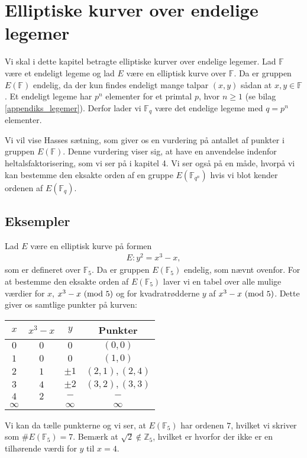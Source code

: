\chapter{Elliptiske kurver over endelige legemer}

Vi skal i dette kapitel betragte elliptiske kurver over endelige legemer. Lad $\mathbb{F}$ være et endeligt legeme og lad $E$ være en elliptisk kurve over $\mathbb{F}$. Da er gruppen $E(\mathbb{F})$ endelig, da der kun findes endeligt mange talpar $(x, y)$ sådan at $x, y \in \mathbb{F}$. Et endeligt legeme har $p^n$ elementer for et primtal $p$, hvor $n \geq 1$ (se bilag \ref{appendiks_legemer}). Derfor lader vi $\mathbb{F}_{q}$ være det endelige legeme med $q = p^n$ elementer. 

Vi vil vise Hasses sætning, som giver os en vurdering på antallet af punkter i gruppen $E(\mathbb{F})$. Denne vurdering viser sig, at have en anvendelse indenfor heltalsfaktorisering, som vi ser på i kapitel 4. Vi ser også på en måde, hvorpå vi kan bestemme den eksakte orden af en gruppe $E(\mathbb{F}_{q^n})$ hvis vi blot kender ordenen af $E(\mathbb{F}_{q})$.


\section{Eksempler}

Lad $E$ være en elliptisk kurve på formen
\begin{align*}
	E : y^2 = x^3 - x,
\end{align*}
som er defineret over $\mathbb{F}_5$. Da er gruppen $E(\mathbb{F}_5)$ endelig, som nævnt ovenfor. For at bestemme den eksakte orden af $E(\mathbb{F}_5)$ laver vi en tabel over alle mulige værdier for $x$, $x^3-x \ (\mathrm{mod} \ 5)$ og for kvadratrødderne $y$ af $x^3 - x \ (\mathrm{mod} \ 5)$. Dette giver os samtlige punkter på kurven:
\begin{center}
\begin{tabular}{c c c c }
$x$ & $x^3 - x$ & $y$ & Punkter \\ 
\hline
$0$ & $0$ & $0$ & $(0, 0)$ \\ 
$1$ & $0$ & $0$ & $(1, 0)$ \\ 
$2$ & $1$ & $\pm 1$ & $(2, 1), (2, 4)$ \\ 
$3$ & $4$ & $\pm 2$ & $(3, 2), (3, 3)$ \\ 
$4$ & $2$ & $-$ & $-$ \\ 
$\infty$ & & $\infty$ & $\infty$ \\
\end{tabular} 
\end{center}
Vi kan da tælle punkterne og vi ser, at $E(\mathbb{F}_5)$ har ordenen $7$, hvilket vi skriver som 
$\#E(\mathbb{F}_5) = 7$. Bemærk at $\sqrt{2} \notin \mathbb{Z}_5$, hvilket er hvorfor der ikke er en tilhørende værdi for $y$ til $x=4$.

